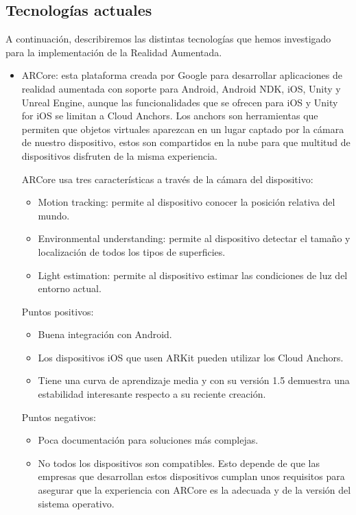 \subsection{Tecnologías actuales}
\label{makereference2.1.1}
A continuación, describiremos las distintas tecnologías que hemos investigado
 para la implementación de la Realidad Aumentada.
\begin{itemize}
    \item ARCore\cite{arcore}: esta plataforma creada por Google para
    desarrollar aplicaciones de realidad aumentada con soporte para Android,
    Android NDK, iOS, Unity y Unreal Engine, aunque las funcionalidades que
    se ofrecen para iOS y Unity for iOS se limitan a Cloud Anchors.
    Los anchors son herramientas que permiten que objetos virtuales
    aparezcan en un lugar captado por la cámara de nuestro dispositivo,
    estos son compartidos en la nube para que multitud de dispositivos
    disfruten de la misma experiencia.

    ARCore usa tres características a través de la cámara del dispositivo:
    \begin{itemize}  
        \item Motion tracking: permite al dispositivo conocer la posición
        relativa del mundo.
        \item Environmental understanding: permite al dispositivo detectar el
        tamaño y localización de todos los tipos de superficies.
        \item Light estimation: permite al dispositivo estimar las condiciones
        de luz del entorno actual.
    \end{itemize}
    Puntos positivos:
    \begin{itemize}
        \item Buena integración con Android.
        \item Los dispositivos iOS que usen ARKit pueden utilizar los Cloud
        Anchors.
        \item Tiene una curva de aprendizaje media y con su versión 1.5
        demuestra una estabilidad interesante respecto a su reciente creación.
    \end{itemize}
    Puntos negativos:
    \begin{itemize}
        \item Poca documentación para soluciones más complejas.
        \item No todos los dispositivos son compatibles.
        Esto depende de que las empresas que desarrollan estos dispositivos
        cumplan unos requisitos para asegurar que la experiencia con ARCore
        es la adecuada y de la versión del sistema operativo.
    \end{itemize}


\end{itemize}
